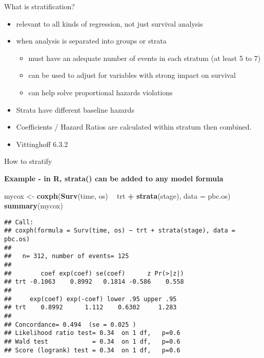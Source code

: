 \documentclass[
  ignorenonframetext,
]{beamer}
\newenvironment{Shaded}{\begin{snugshade}}{\end{snugshade}}
\newcommand{\DataTypeTok}[1]{\textcolor[rgb]{0.13,0.29,0.53}{#1}}
\newcommand{\KeywordTok}[1]{\textcolor[rgb]{0.13,0.29,0.53}{\textbf{#1}}}
\newcommand{\NormalTok}[1]{#1}
\newcommand{\OperatorTok}[1]{\textcolor[rgb]{0.81,0.36,0.00}{\textbf{#1}}}
\newcommand{\StringTok}[1]{\textcolor[rgb]{0.31,0.60,0.02}{#1}}
\providecommand{\tightlist}{%
  \setlength{\itemsep}{0pt}\setlength{\parskip}{0pt}}
\begin{document}
\begin{frame}{What is stratification?}
\protect\hypertarget{what-is-stratification}{}

\begin{itemize}
\item
  relevant to all kinds of regression, not just survival analysis
\item
  when analysis is separated into groups or strata

  \begin{itemize}
  \tightlist
  \item
    must have an adequate number of events in each stratum (at least 5
    to 7)
  \item
    can be used to adjust for variables with strong impact on survival
  \item
    can help solve proportional hazards violations
  \end{itemize}
\item
  Strata have different baseline hazards
\item
  Coefficients / Hazard Ratios are calculated within stratum then
  combined.
\item
  Vittinghoff 6.3.2
\end{itemize}

\end{frame}

\begin{frame}[fragile]{How to stratify}
\protect\hypertarget{how-to-stratify}{}

\textbf{Example - in R, strata() can be added to any model formula}
\footnotesize

\begin{Shaded}
\begin{Highlighting}[]
\NormalTok{mycox <-}\StringTok{ }\KeywordTok{coxph}\NormalTok{(}\KeywordTok{Surv}\NormalTok{(time, os) }\OperatorTok{~}\StringTok{ }\NormalTok{trt }\OperatorTok{+}\StringTok{ }\KeywordTok{strata}\NormalTok{(stage), }
               \DataTypeTok{data =}\NormalTok{ pbc.os)}
\KeywordTok{summary}\NormalTok{(mycox)}
\end{Highlighting}
\end{Shaded}

\begin{verbatim}
## Call:
## coxph(formula = Surv(time, os) ~ trt + strata(stage), data = pbc.os)
## 
##   n= 312, number of events= 125 
## 
##        coef exp(coef) se(coef)      z Pr(>|z|)
## trt -0.1063    0.8992   0.1814 -0.586    0.558
## 
##     exp(coef) exp(-coef) lower .95 upper .95
## trt    0.8992      1.112    0.6302     1.283
## 
## Concordance= 0.494  (se = 0.025 )
## Likelihood ratio test= 0.34  on 1 df,   p=0.6
## Wald test            = 0.34  on 1 df,   p=0.6
## Score (logrank) test = 0.34  on 1 df,   p=0.6
\end{verbatim}

\end{frame}
\end{document}
